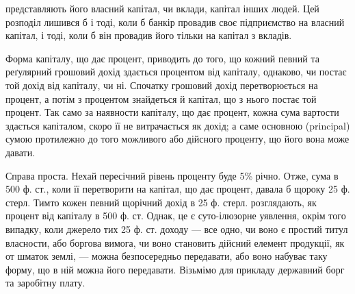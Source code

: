 \parcont{}  %
представляють його власний капітал, чи вклади, капітал інших людей. Цей
розподіл лишився б і тоді, коли б банкір провадив своє підприємство на власний
капітал, і тоді, коли б він провадив його тільки на капітал з вкладів.

Форма капіталу, що дає процент, приводить до того, що кожний певний
та реґулярний грошовий дохід здається процентом від капіталу, однаково, чи
постає той дохід від капіталу, чи ні. Спочатку грошовий дохід перетворюється
на процент, а потім з процентом знайдеться й капітал, що з нього постає той
процент. Так само за наявности капіталу, що дає процент, кожна сума вартости
здається капіталом, скоро її не витрачається як дохід; а саме основною (principal)
сумою протилежно до того можливого або дійсного проценту, що його вона
може давати.

Справа проста. Нехай пересічний рівень проценту буде 5\% річно. Отже,
сума в 500 ф. ст., коли її перетворити на капітал, що дає процент, давала б
щороку 25 ф. стерл. Тимто кожен певний щорічний дохід в 25 ф. стерл. розглядають,
як процент від капіталу в 500 ф. ст. Однак, це є суто-ілюзорне
уявлення, окрім того випадку, коли джерело тих 25 ф. ст. доходу — все одно,
чи воно є простий титул власности, або боргова вимога, чи воно становить
дійсний елемент продукції, як от шматок землі, — можна безпосередньо передавати,
або воно набуває таку форму, що в ній можна його передавати. Візьмімо
для прикладу державний борг та заробітну плату.

